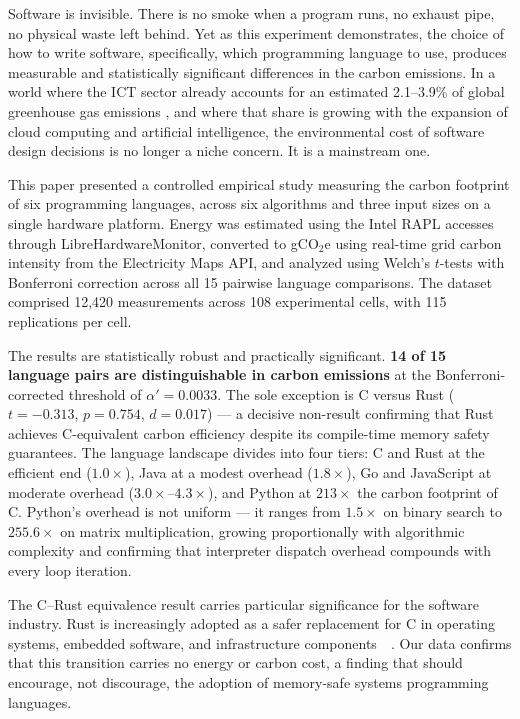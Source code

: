 Software is invisible. There is no smoke when a program runs, no exhaust pipe, no physical waste left behind. Yet as this experiment demonstrates, the choice of how to write software, specifically, which programming language to use, produces measurable and statistically significant differences in the carbon emissions. In a world where the ICT sector already accounts for an estimated 2.1--3.9\% of global greenhouse gas emissions \cite{ict_stat}, and where that share is growing with the expansion of cloud computing and artificial intelligence, the environmental cost of software design decisions is no longer a niche concern. It is a mainstream one. 

This paper presented a controlled empirical study measuring the carbon footprint of six programming languages, across six algorithms and three input sizes on a single hardware platform. Energy was estimated using the Intel RAPL accesses through LibreHardwareMonitor, converted to gCO$_2$e using real-time grid carbon intensity from the Electricity Maps API, and analyzed using Welch's $t$-tests with Bonferroni correction across all 15 pairwise language comparisons. The dataset comprised 12,420 measurements across 108 experimental cells, with 115 replications per cell.

The results are statistically robust and practically significant. \textbf{14 of 15 language pairs are distinguishable in carbon emissions} at the Bonferroni-corrected threshold of $\alpha' = 0.0033$. The sole exception is C versus Rust ($t = -0.313$, $p = 0.754$, $d = 0.017$) --- a decisive non-result confirming that Rust achieves C-equivalent carbon efficiency despite its compile-time memory safety guarantees. The language landscape divides into four tiers: C and Rust at the efficient end ($1.0\times$), Java at a modest overhead ($1.8\times$), Go and JavaScript at moderate overhead ($3.0\times$--$4.3\times$), and Python at $213\times$ the carbon footprint of C. Python's overhead is not uniform --- it ranges from $1.5\times$ on binary search to $255.6\times$ on matrix multiplication, growing proportionally with algorithmic complexity and confirming that interpreter dispatch overhead compounds with every loop iteration.

The C--Rust equivalence result carries particular significance for the software industry. Rust is increasingly adopted as a safer replacement for C in operating systems, embedded software, and infrastructure components~\cite{google2025rustAndroid}~\cite{linux2026rust}. Our data confirms that this transition carries no energy or carbon cost, a finding that should encourage, not discourage, the adoption of memory-safe systems programming languages.

